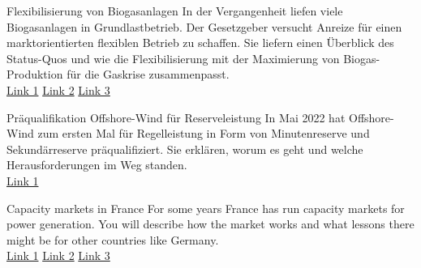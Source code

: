 \documentclass[10pt,aspectratio=169,dvipsnames]{beamer}
\begin{document}
\begin{frame}
    \begin{block}{Flexibilisierung von Biogasanlagen}
    In der Vergangenheit liefen viele Biogasanlagen in Grundlastbetrieb. Der Gesetzgeber versucht Anreize für einen marktorientierten flexiblen Betrieb zu schaffen. Sie liefern einen Überblick des Status-Quos und wie die Flexibilisierung mit der Maximierung von Biogas-Produktion für die Gaskrise zusammenpasst.\\
    \href{https://www.kwk-flexperten.net/flexibilisierung-von-biogasanlagen}{Link 1}
    \href{https://biogas.fnr.de/biogas-nutzung/stromerzeugung/flexibilisierung-von-biogasanlagen}{Link 2}
    \href{https://www.dbfz.de/fileadmin//user_upload/Referenzen/Studien/160323_Externes_Hintergrundpapier_Flexibilisierung_von_Biogasanlagen_in_Deutschland.pdf}{Link 3}
    \end{block}
    \begin{block}{Präqualifikation Offshore-Wind für Reserveleistung}
    In Mai 2022 hat Offshore-Wind zum ersten Mal für Regelleistung in Form von Minutenreserve und Sekundärreserve präqualifiziert. Sie erklären, worum es geht und welche Herausforderungen im Weg standen.\\
    \href{https://orsted.de/presse-media/news/2022/05/borkum-riffgrund-1-regelenergie}{Link 1}
    \end{block}
    \begin{block}{Capacity markets in France}
    For some years France has run capacity markets for power generation. You will describe how the market works and what lessons there might be for other countries like Germany.\\
    \href{https://www.eex.com/en/services/registry-services/french-capacity-guarantees-for-rte}{Link 1}
    \href{https://www.services-rte.com/en/learn-more-about-our-services/participate-in-the-capacity-mechanism.html}{Link 2}
    \href{https://www.agora-energiewende.de/en/projects/comparing-capacity-market-designs-in-france-and-potentially-germany/}{Link 3}
    \end{block}
\end{frame}
\end{document}
